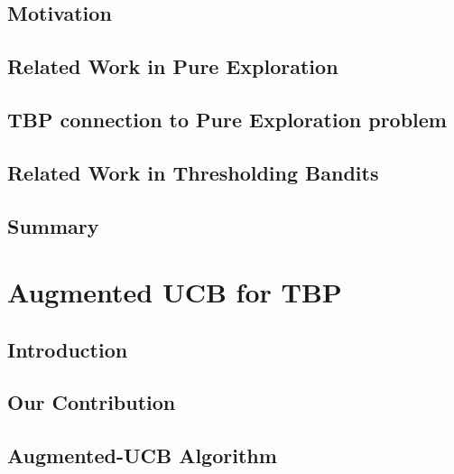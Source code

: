 \documentclass[MS]{iitmdiss}
\begin{document}
\section{Motivation}
\label{tbandit:motivation}


\section{Related Work in Pure Exploration}
\label{tbandit:prevRes}


\section{TBP connection to Pure Exploration problem}
\label{tbandit:connection}



\section{Related Work in Thresholding Bandits}
\label{tbandit:prevResAPT}



\section{Summary}
\label{tbandit:conc}







\chapter{Augmented UCB for TBP}
\label{chap:tbandit2}

\section{Introduction}
\label{tbandit:intro2}



\section{Our Contribution}
\label{tbandit:contribution}



\section{Augmented-UCB Algorithm}
\label{tbandit:algorithm}

\end{document}
